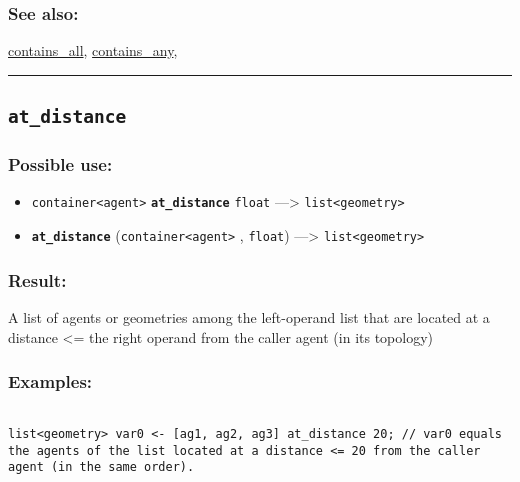 \documentclass[]{book}
\providecommand{\tightlist}{%
  \setlength{\itemsep}{0pt}\setlength{\parskip}{0pt}}
\theoremstyle{definition}
\theoremstyle{definition}
\theoremstyle{definition}
\theoremstyle{remark}
\begin{document}
\subsubsection{See also:}\label{see-also-39}

\href{OperatorsBC\#contains_all}{contains\_all},
\href{OperatorsBC\#contains_any}{contains\_any},

\begin{center}\rule{0.5\linewidth}{\linethickness}\end{center}

\subsection{\texorpdfstring{\texttt{at\_distance}}{at\_distance}}\label{at_distance}

\subsubsection{Possible use:}\label{possible-use-57}

\begin{itemize}
\tightlist
\item
  \texttt{container\textless{}agent\textgreater{}}
  \textbf{\texttt{at\_distance}} \texttt{float} ---\textgreater{}
  \texttt{list\textless{}geometry\textgreater{}}
\item
  \textbf{\texttt{at\_distance}}
  (\texttt{container\textless{}agent\textgreater{}} , \texttt{float})
  ---\textgreater{} \texttt{list\textless{}geometry\textgreater{}}
\end{itemize}

\subsubsection{Result:}\label{result-56}

A list of agents or geometries among the left-operand list that are
located at a distance \textless{}= the right operand from the caller
agent (in its topology)

\subsubsection{Examples:}\label{examples-47}

\begin{verbatim}
 
list<geometry> var0 <- [ag1, ag2, ag3] at_distance 20; // var0 equals the agents of the list located at a distance <= 20 from the caller agent (in the same order).
\end{verbatim}
\end{document}
